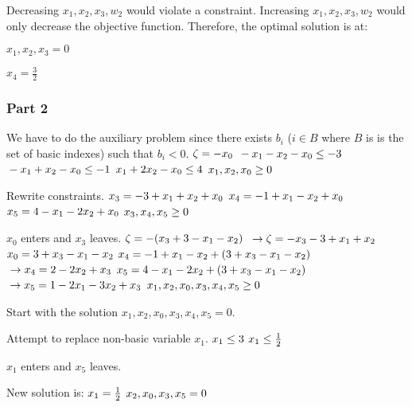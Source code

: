 \documentclass{article}
\begin{document}
Decreasing $x_1, x_2, x_3, w_2$ would violate a constraint. Increasing $x_1, x_2, x_3, w_2$ would only decrease the objective function. Therefore, the optimal solution is at:

$x_1, x_2, x_3 = 0$

$x_4 = \frac{3}{2}$

\subsubsection*{Part 2}
We have to do the auxiliary problem since there exists $b_i$ ($i \in B$ where $B$ is is the set of basic indexes) such that $b_i < 0$.
$\\\zeta = -x_0$
$\\ -x_1 - x_2 - x_0 \leq -3$
$\\ -x_1 + x_2 - x_0 \leq -1$
$\\ x_1 + 2x_2 - x_0 \leq 4$
$\\ x_1, x_2, x_0 \geq 0$

Rewrite constraints.
$\\ x_3 = - 3 + x_1 + x_2 + x_0$
$\\ x_4 = - 1 + x_1 - x_2 + x_0$
$\\ x_5 = 4 - x_1 - 2x_2 + x_0$
$\\ x_3, x_4, x_5 \geq 0$

$x_0$ enters and $x_3$ leaves.
$\\\zeta = -(x_3 + 3 - x_1 - x_2)$
$\\\to \zeta = -x_3 - 3 + x_1 + x_2$
$\\ x_0 = 3 + x_3 - x_1 - x_2$
$\\ x_4 = - 1 + x_1 - x_2 + (3 + x_3 - x_1 - x_2)$
$\\\to x_4 = 2 - 2x_2 + x_3$
$\\ x_5 = 4 - x_1 - 2x_2 + (3 + x_3 - x_1 - x_2)$
$\\\to x_5 = 1 - 2x_1 - 3x_2 + x_3$
$\\ x_1, x_2, x_0, x_3, x_4, x_5 \geq 0$

Start with the solution $x_1, x_2, x_0, x_3, x_4, x_5 = 0$.

Attempt to replace non-basic variable $x_1$.
$\\ x_1 \leq 3$
$\\ x_1 \leq \frac{1}{2}$

$x_1$ enters and $x_5$ leaves.

New solution is:
$\\x_1 = \frac{1}{2}$
$\\x_2, x_0, x_3, x_5 = 0$
\end{document}
